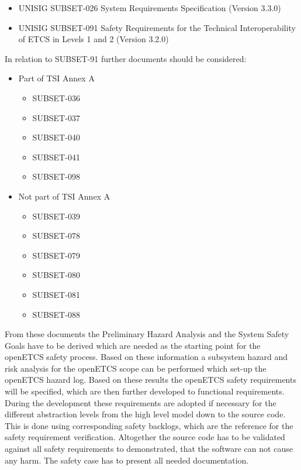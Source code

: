 \documentclass{template/openetcs_article}
\begin{document}
\begin{itemize}
\item UNISIG SUBSET-026	System Requirements Specification 	(Version 3.3.0)
\item UNISIG SUBSET-091 Safety Requirements for the Technical Interoperability of ETCS in Levels 1 and 2 	(Version 3.2.0)
\end{itemize}

In relation to SUBSET-91 further documents should be considered:

\begin{itemize}
\item Part of TSI Annex A
	\begin{itemize}
	\item SUBSET-036
	\item SUBSET-037
	\item SUBSET-040
	\item SUBSET-041
	\item SUBSET-098
	\end{itemize}
	
\item Not part of TSI Annex A
	\begin{itemize}
	\item SUBSET-039
	\item SUBSET-078
	\item SUBSET-079
	\item SUBSET-080
	\item SUBSET-081
	\item SUBSET-088
	\end{itemize}
\end{itemize}

From these documents the Preliminary Hazard Analysis and the System Safety Goals have to be derived which are needed as the starting point for the openETCS safety process. Based on these information a subsystem hazard and risk analysis for the openETCS scope can be performed which set-up the openETCS hazard log. Based on these results the openETCS safety requirements will be specified, which are then further developed to functional requirements. During the development these requirements are adopted if necessary for the different abstraction levels from the high level model down to the source code. This is done using corresponding safety backlogs, which are the reference for the safety requirement verification. Altogether the source code has to be validated against all safety requirements to demonstrated, that the software can not cause any harm. The safety case has to present all needed documentation.
 
\end{document}

